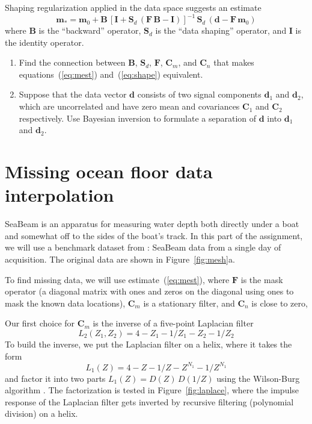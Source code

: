 Shaping regularization applied in the data space suggests an estimate
\begin{equation}
\label{eq:shape}
\mathbf{m}_{*} = \mathbf{m}_0 + \mathbf{B}\,\left[\mathbf{I} + \mathbf{S}_d\,(\mathbf{F}\,\mathbf{B} - \mathbf{I})\right]^{-1}\,
\mathbf{S}_d\,\left(\mathbf{d} - \mathbf{F}\,\mathbf{m}_0\right)
\end{equation}
where $\mathbf{B}$ is the ``backward'' operator, $\mathbf{S}_d$ is the ``data shaping'' operator, and $\mathbf{I}$ is the identity operator. 

\begin{enumerate}
\item Find the connection between $\mathbf{B}$,  $\mathbf{S}_d$, $\mathbf{F}$, $\mathbf{C}_m$, and $\mathbf{C}_n$ that makes equations~(\ref{eq:mest}) and~(\ref{eq:shape})
equivalent.
\item Suppose that the data vector $\mathbf{d}$ consists of two signal components $\mathbf{d}_1$ and $\mathbf{d}_2$, which are uncorrelated and 
have zero mean and covariances $\mathbf{C}_1$ and $\mathbf{C}_2$ respectively. Use Bayesian inversion to formulate a separation of
$\mathbf{d}$ into $\mathbf{d}_1$ and $\mathbf{d}_2$.
\end{enumerate}

\section{Missing ocean floor data interpolation}

SeaBeam is an apparatus for measuring water depth both directly under
a boat and somewhat off to the sides of the boat's track. In this part
of the assignment, we will use a benchmark dataset from \cite{gee}:
SeaBeam data from a single day of acquisition. The original data are
shown in Figure~\ref{fig:mesh}a.


To find missing data, we will use estimate~(\ref{eq:mest}), where
$\mathbf{F}$ is the mask operator (a diagonal matrix with ones and
zeros on the diagonal using ones to mask the known data locations),
$\mathbf{C}_m$ is a stationary filter, and $\mathbf{C}_n$ is close to
zero,

Our first choice for $\mathbf{C}_m$ is the inverse of a five-point
Laplacian filter
\begin{equation}
\label{eq:lap2}
L_2(Z_1,Z_2) = 4 - Z_1 - 1/Z_1 - Z_2 - 1/Z_2
\end{equation} 
To build the inverse, we put the Laplacian
filter on a helix, where it takes the form
\begin{equation}
\label{eq:lap1}
L_1(Z) = 4 - Z - 1/Z - Z^{N_1} - 1/Z^{N_1}
\end{equation} 
and factor it into two parts $L_1(Z) = D(Z)\,D(1/Z)$ using the
Wilson-Burg algorithm \cite[]{burg}. The factorization is tested in
Figure~\ref{fig:laplace}, where the impulse response of the Laplacian
filter gets inverted by recursive filtering (polynomial division) on a
helix. 

